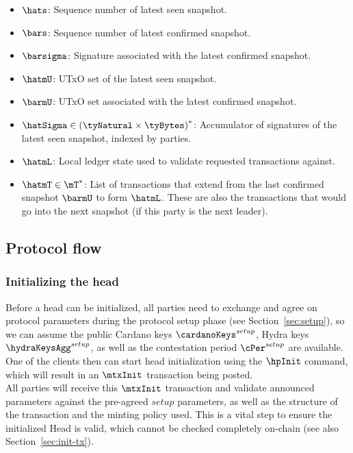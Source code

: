 \begin{itemize}
	\item $\hats$: Sequence number of latest seen snapshot.
	\item $\bars$: Sequence number of latest confirmed snapshot.
	\item $\barsigma$: Signature associated with the latest confirmed snapshot.
	\item $\hatmU$: UTxO set of the latest seen snapshot.
	\item $\barmU$: UTxO set associated with the latest confirmed snapshot.
	\item $\hatSigma \in {(\tyNatural \times \tyBytes)}^{*}$: Accumulator of
	      signatures of the latest seen snapshot, indexed by parties.
	\item $\hatmL$: Local ledger state used to validate requested transactions
	      against.
	\item $\hatmT \in \mT^{*}$: List of transactions that extend from the last
	      confirmed snapshot $\barmU$ to form $\hatmL$. These are also the
	      transactions that would go into the next snapshot (if this party is the
	      next leader).
\end{itemize}

\subsection{Protocol flow}

\subsubsection{Initializing the head}

\quad Before a head can be initialized, all parties need
to exchange and agree on protocol parameters during the protocol setup phase
(see Section~\ref{sec:setup}), so we can assume the public Cardano keys
$\cardanoKeys^{setup}$, Hydra keys $\hydraKeysAgg^{setup}$, as well as the
contestation period $\cPer^{setup}$ are available. One of the clients then can
start head initialization using the $\hpInit$ command, which will result in an
$\mtxInit$ transaction being posted. \\

\quad All parties will receive this $\mtxInit$
transaction and validate announced parameters against the pre-agreed $setup$
parameters, as well as the structure of the transaction and the minting policy
used. This is a vital step to ensure the initialized Head is valid, which
cannot be checked completely on-chain (see also Section~\ref{sec:init-tx}). \\

